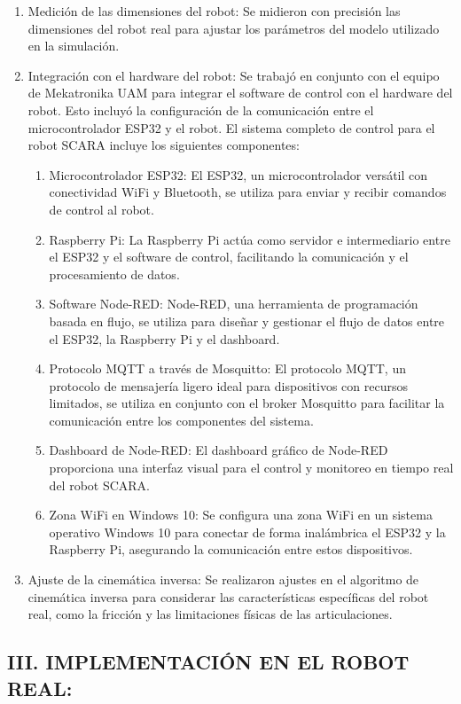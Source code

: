 \documentclass[final]{foresj}
\begin{document}
\begin{enumerate}
\item Medición de las dimensiones del robot: Se midieron con precisión las dimensiones del robot real para ajustar los parámetros del modelo utilizado en la simulación.
\item Integración con el hardware del robot: Se trabajó en conjunto con el equipo de Mekatronika UAM para integrar el software de control con el hardware del robot. Esto incluyó la configuración de la comunicación entre el microcontrolador ESP32 y el robot. El sistema completo de control para el robot SCARA incluye los siguientes componentes:
    \begin{enumerate}
    \item Microcontrolador ESP32: El ESP32, un microcontrolador versátil con conectividad WiFi y Bluetooth, se utiliza para enviar y recibir comandos de control al robot.
    \item Raspberry Pi: La Raspberry Pi actúa como servidor e intermediario entre el ESP32 y el software de control, facilitando la comunicación y el procesamiento de datos.
    \item Software Node-RED: Node-RED, una herramienta de programación basada en flujo, se utiliza para diseñar y gestionar el flujo de datos entre el ESP32, la Raspberry Pi y el dashboard.
    \item Protocolo MQTT a través de Mosquitto: El protocolo MQTT, un protocolo de mensajería ligero ideal para dispositivos con recursos limitados, se utiliza en conjunto con el broker Mosquitto para facilitar la comunicación entre los componentes del sistema.
    \item Dashboard de Node-RED: El dashboard gráfico de Node-RED proporciona una interfaz visual para el control y monitoreo en tiempo real del robot SCARA.
    \item Zona WiFi en Windows 10: Se configura una zona WiFi en un sistema operativo Windows 10 para conectar de forma inalámbrica el ESP32 y la Raspberry Pi, asegurando la comunicación entre estos dispositivos.
    \end{enumerate}
\item Ajuste de la cinemática inversa: Se realizaron ajustes en el algoritmo de cinemática inversa para considerar las características específicas del robot real, como la fricción y las limitaciones físicas de las articulaciones.
\end{enumerate}

\subsection{III. IMPLEMENTACIÓN EN EL ROBOT REAL:}
\end{document}
